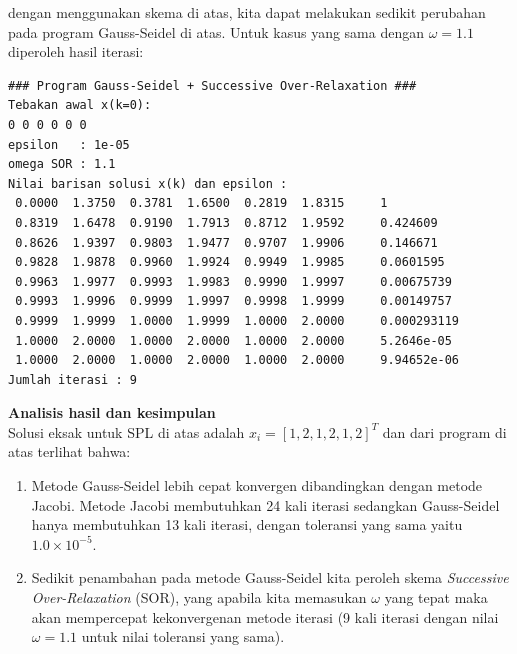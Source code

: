 \documentclass[paper=a4, fontsize=11pt]{scrartcl}
\numberwithin{equation}{section} %
\numberwithin{figure}{section} %
\numberwithin{table}{section} %
\begin{document}
dengan menggunakan skema di atas, kita dapat melakukan sedikit perubahan pada program Gauss-Seidel di atas. Untuk kasus yang sama dengan $\omega = 1.1$ diperoleh hasil iterasi:

\begin{small}
\begin{verbatim}
### Program Gauss-Seidel + Successive Over-Relaxation ###
Tebakan awal x(k=0): 
0 0 0 0 0 0 
epsilon   : 1e-05
omega SOR : 1.1
Nilai barisan solusi x(k) dan epsilon : 
 0.0000  1.3750  0.3781  1.6500  0.2819  1.8315 	1
 0.8319  1.6478  0.9190  1.7913  0.8712  1.9592 	0.424609
 0.8626  1.9397  0.9803  1.9477  0.9707  1.9906 	0.146671
 0.9828  1.9878  0.9960  1.9924  0.9949  1.9985 	0.0601595
 0.9963  1.9977  0.9993  1.9983  0.9990  1.9997 	0.00675739
 0.9993  1.9996  0.9999  1.9997  0.9998  1.9999 	0.00149757
 0.9999  1.9999  1.0000  1.9999  1.0000  2.0000 	0.000293119
 1.0000  2.0000  1.0000  2.0000  1.0000  2.0000 	5.2646e-05
 1.0000  2.0000  1.0000  2.0000  1.0000  2.0000 	9.94652e-06
Jumlah iterasi : 9
\end{verbatim}
\end{small}

\textbf{Analisis hasil dan kesimpulan}\\
Solusi eksak untuk SPL di atas adalah $x_{i} = [1, 2, 1, 2, 1, 2]^{T}$ dan dari program di atas terlihat bahwa:
\begin{enumerate}
\item Metode Gauss-Seidel lebih cepat konvergen dibandingkan dengan metode Jacobi. Metode Jacobi membutuhkan 24 kali iterasi sedangkan Gauss-Seidel hanya membutuhkan 13 kali iterasi, dengan toleransi yang sama yaitu $1.0\times 10^{-5}$.
\item Sedikit penambahan pada metode Gauss-Seidel kita peroleh skema \textit{Successive Over-Relaxation} (SOR), yang apabila kita memasukan $\omega $ yang tepat maka akan mempercepat kekonvergenan metode iterasi (9 kali iterasi dengan nilai $\omega = 1.1$ untuk nilai toleransi yang sama).
\end{enumerate}
\end{document}
